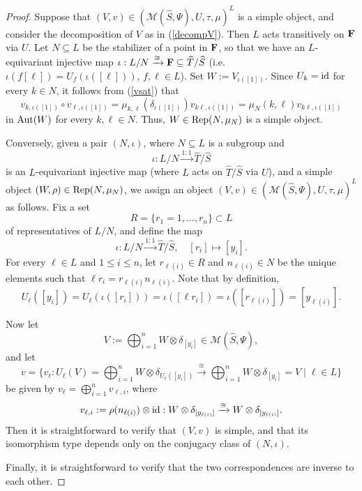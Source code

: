 \documentclass{amsart}
\theoremstyle{definition}
\newcommand{\id}{{\rm id}}
\newcommand{\M}{\mathscr{M}}
\newcommand{\ot}{\otimes}
\numberwithin{equation}{section}
\begin{document}
\begin{proof}
Suppose that $(V,v)\in \left(\M(\widehat{S},\Psi),U,\tau,\mu\right)^L$ is a simple object, and consider the decomposition of $V$ as in (\ref{decompV}). Then $L$ acts transitively on ${\bf F}$ via $U$. Let $N\subseteq L$ be the stabilizer of a point in ${\bf F}$, so that we have an $L$-equivariant injective map $\iota:L/N\xrightarrow{\cong}{\bf F}\subseteq  \widehat{T}/\widehat{S}$ (i.e. $\iota(f[\ell])=U_f(\iota([\ell]))$, $f,\ell\in L$). Set $W:=V_{\iota([1])}$. Since $U_k=\id$ for every $k\in N$, it follows from (\ref{vsat}) that  
$$v_{k,\iota([1])}\circ v_{\ell,\iota([1])}=\mu_{k,\ell}(\delta_{\iota([1])})v_{k\ell,\iota([1])}=\mu_N(k,\ell)v_{k\ell,\iota([1])}$$
in ${\rm Aut}(W)$ for every $k,\ell\in N$. Thus, $W\in {\rm Rep}(N,\mu_N)$ is a simple object.

Conversely, given a pair $(N,\iota)$, where $N\subseteq L$ is a subgroup and 
$$\iota:L/N\xrightarrow{1:1} \widehat{T}/\widehat{S}$$ is an $L$-equivariant injective map (where $L$ acts on $\widehat{T}/\widehat{S}$ via $U$), and a simple object $(W,\rho)\in {\rm Rep}(N,\mu_N)$, we assign an object $(V,v)\in \left(\M(\widehat{S},\Psi),U,\tau,\mu\right)^L$ as follows. 
Fix a set 
$$R=\{r_1=1,\dots,r_n\}\subset L$$ of representatives of $L/N$, and define the map  
\begin{equation}\label{defnyi}
\iota:L/N\xrightarrow{1:1} \widehat{T}/\widehat{S},\quad [r_i]\mapsto [y_i].
\end{equation}
For every $\ell\in L$ and $1\le i\le n$, let $r_{\ell(i)}\in R$ and $n_{\ell(i)}\in N$ be the unique elements such that $\ell r_i = r_{\ell(i)}n_{\ell(i)}$. Note that by definition,
$$U_{\ell}([y_i])=U_{\ell}(\iota([r_i]))=\iota([\ell r_i])=\iota([r_{\ell(i)}])=[y_{\ell(i)}].$$ 

Now let
$$V := \bigoplus_{i=1}^n W\ot\delta_{[y_i]}\in \M(\widehat{S},\Psi),$$ 
and let
$$v=\{v_{\ell}:U_{\ell}(V)=\bigoplus_{i=1}^n W\ot\delta_{U_{\ell}([y_i])}\xrightarrow{\cong}\bigoplus_{i=1}^n  W\ot\delta_{[y_i]}=V\mid \ell\in L\}$$
be given by $v_{\ell}=\bigoplus_{i=1}^n v_{\ell,i}$, where 
$$v_{\ell,i}:=\rho(n_{\ell(i)})\ot\id:W\ot\delta_{[y_{\ell(i)}]}\xrightarrow{\cong}W\ot\delta_{[y_{\ell(i)}]}.$$
Then it is straightforward to verify that $(V,v)$ is simple, and that its isomorphism type depends only on the conjugacy class of $(N,\iota)$.

Finally, it is straightforward to verify that the two correspondences are inverse to each other. 
\end{proof}
\end{document}
